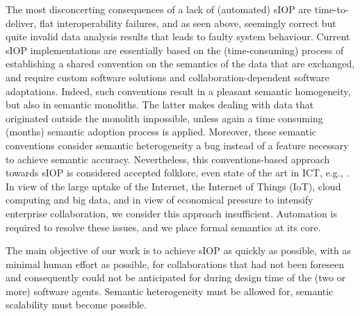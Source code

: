 \documentclass[sort&compress,preprint,authoryear,3p,twocolumn]{elsarticle}
\begin{document}
The most disconcerting consequences of a lack of (automated) sIOP are
time-to-deliver, flat interoperability failures, and as seen above,
seemingly correct but quite invalid data analysis results that leads to
faulty system behaviour. Current sIOP implementations are essentially
based on the (time-consuming) process of establishing a shared
convention on the semantics of the data that are exchanged, and require
custom software solutions and collaboration-dependent software
adaptations. Indeed, such conventions result in a pleasant semantic
homogeneity, but also in semantic monoliths. The latter makes dealing
with data that originated outside the monolith impossible, unless again
a time consuming (months) semantic adoption process is applied.
Moreover, these semantic conventions consider semantic heterogeneity a
bug instead of a feature necessary to achieve semantic accuracy.
Nevertheless, this conventions-based approach towards sIOP is considered
accepted folklore, even state of the art in ICT, e.g., \citep{Otto2019}.
In view of the large uptake of the Internet, the Internet of Things
(IoT), cloud computing and big data, and in view of economical pressure
to intensify enterprise collaboration, we consider this approach
insufficient. Automation is required to resolve these issues, and we
place formal semantics at its core.

The main objective of our work is to achieve sIOP as quickly as
possible, with as minimal human effort as possible, for collaborations
that had not been foreseen and consequently could not be anticipated for
during design time of the (two or more) software agents. Semantic
heterogeneity must be allowed for, semantic scalability must become
possible.
\end{document}
